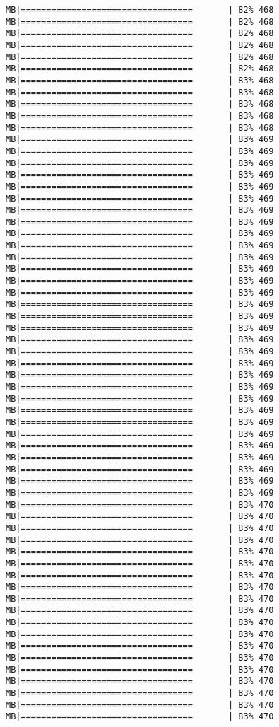 \documentclass[
]{article}
\begin{document}
\begin{verbatim}
MB|==================================       | 82% 468 MB|==================================       | 82% 468 MB|==================================       | 82% 468 MB|==================================       | 82% 468 MB|==================================       | 82% 468 MB|==================================       | 82% 468 MB|==================================       | 83% 468 MB|==================================       | 83% 468 MB|==================================       | 83% 468 MB|==================================       | 83% 468 MB|==================================       | 83% 468 MB|==================================       | 83% 469 MB|==================================       | 83% 469 MB|==================================       | 83% 469 MB|==================================       | 83% 469 MB|==================================       | 83% 469 MB|==================================       | 83% 469 MB|==================================       | 83% 469 MB|==================================       | 83% 469 MB|==================================       | 83% 469 MB|==================================       | 83% 469 MB|==================================       | 83% 469 MB|==================================       | 83% 469 MB|==================================       | 83% 469 MB|==================================       | 83% 469 MB|==================================       | 83% 469 MB|==================================       | 83% 469 MB|==================================       | 83% 469 MB|==================================       | 83% 469 MB|==================================       | 83% 469 MB|==================================       | 83% 469 MB|==================================       | 83% 469 MB|==================================       | 83% 469 MB|==================================       | 83% 469 MB|==================================       | 83% 469 MB|==================================       | 83% 469 MB|==================================       | 83% 469 MB|==================================       | 83% 469 MB|==================================       | 83% 469 MB|==================================       | 83% 469 MB|==================================       | 83% 469 MB|==================================       | 83% 469 MB|==================================       | 83% 470 MB|==================================       | 83% 470 MB|==================================       | 83% 470 MB|==================================       | 83% 470 MB|==================================       | 83% 470 MB|==================================       | 83% 470 MB|==================================       | 83% 470 MB|==================================       | 83% 470 MB|==================================       | 83% 470 MB|==================================       | 83% 470 MB|==================================       | 83% 470 MB|==================================       | 83% 470 MB|==================================       | 83% 470 MB|==================================       | 83% 470 MB|==================================       | 83% 470 MB|==================================       | 83% 470 MB|==================================       | 83% 470 MB|==================================       | 83% 470 MB|==================================       | 83% 470 
\end{verbatim}
\end{document}
